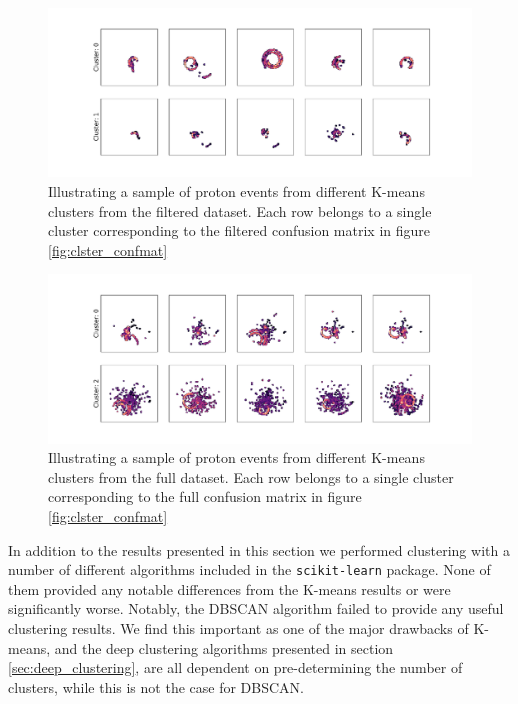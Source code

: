 \begin{figure}
\includegraphics[width=\textwidth]{plots/filtered_vgg_cluster_repr.pdf}
\caption[Filtered proton samples by cluster belonging]{Illustrating a sample of proton events from different K-means clusters from the filtered dataset. Each row belongs to a single cluster corresponding to the filtered confusion matrix in figure \ref{fig:clster_confmat}}\label{fig:vgg_clster_repr}
\end{figure} 

\begin{figure}
\includegraphics[width=\textwidth]{plots/full_vgg_cluster_repr.pdf}
\caption[Full proton samples by cluster belonging]{Illustrating a sample of proton events from different K-means clusters from the full dataset. Each row belongs to a single cluster corresponding to the full confusion matrix in figure \ref{fig:clster_confmat}}\label{fig:vgg_clster_repr}
\end{figure} 

In addition to the results presented in this section we performed clustering with a number of different algorithms included in the \lstinline{scikit-learn} package. None of them provided any notable differences from the K-means results or were significantly worse. Notably, the DBSCAN algorithm failed to provide any useful clustering results. We find this important as one of the major drawbacks of K-means, and the deep clustering algorithms presented in section \ref{sec:deep_clustering}, are all dependent on pre-determining the number of clusters, while this is not the case for DBSCAN. 